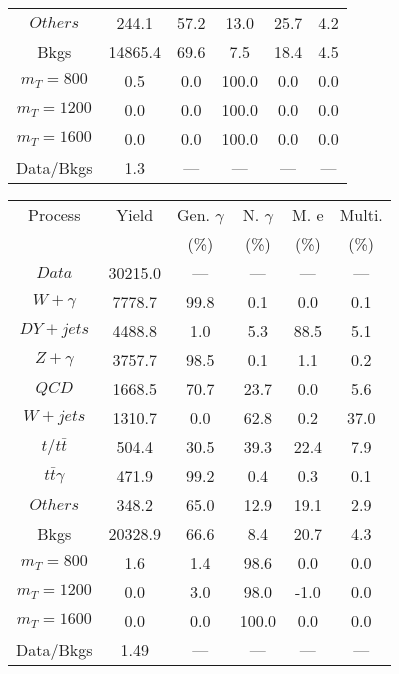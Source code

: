 \begin{figure}
\begin{minipage}[c]{0.32\textwidth}
{\begin{tabular}{cccccc}
$ Others $ &  244.1 &  57.2 &  13.0 &  25.7 &  4.2\\
Bkgs &  14865.4 &  69.6 &  7.5 &  18.4 &  4.5\\
$ m_{T} = 800 $ &  0.5 &  0.0 &  100.0 &  0.0 &  0.0\\
$ m_{T} = 1200 $ &  0.0 &  0.0 &  100.0 &  0.0 &  0.0\\
$ m_{T} = 1600 $ &  0.0 &  0.0 &  100.0 &  0.0 &  0.0\\
Data/Bkgs &  1.3 &  --- &  --- &  --- &  ---\\
\hline
\end{tabular}
}
\end{minipage}
\begin{minipage}[c]{0.32\textwidth}
\centering
\tiny{
\begin{tabular}{cccccc}
\hline
Process & Yield & Gen. $\gamma$ & N. $\gamma$ & M. e & Multi. \\
 &  & (\%) & (\%) & (\%) & (\%)  \\
\hline
                                                                      $ Data $ &  30215.0 &  --- &  --- &  --- &  ---\\
$ W+\gamma $ &  7778.7 &  99.8 &  0.1 &  0.0 &  0.1\\
$ DY+jets $ &  4488.8 &  1.0 &  5.3 &  88.5 &  5.1\\
$ Z+\gamma $ &  3757.7 &  98.5 &  0.1 &  1.1 &  0.2\\
$ QCD $ &  1668.5 &  70.7 &  23.7 &  0.0 &  5.6\\
$ W+jets $ &  1310.7 &  0.0 &  62.8 &  0.2 &  37.0\\
$ t/t\bar{t} $ &  504.4 &  30.5 &  39.3 &  22.4 &  7.9\\
$ t\bar{t}\gamma $ &  471.9 &  99.2 &  0.4 &  0.3 &  0.1\\
$ Others $ &  348.2 &  65.0 &  12.9 &  19.1 &  2.9\\
Bkgs &  20328.9 &  66.6 &  8.4 &  20.7 &  4.3\\
$ m_{T} = 800 $ &  1.6 &  1.4 &  98.6 &  0.0 &  0.0\\
$ m_{T} = 1200 $ &  0.0 &  3.0 &  98.0 &  -1.0 &  0.0\\
$ m_{T} = 1600 $ &  0.0 &  0.0 &  100.0 &  0.0 &  0.0\\
Data/Bkgs &  1.49 &  --- &  --- &  --- &  ---\\
\hline
\end{tabular}
}
\end{minipage}
\begin{minipage}[c]{0.32\textwidth}
\centering

\end{minipage}
\end{figure}
